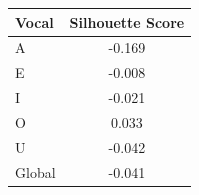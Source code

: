 \begin{tabular}{lc}
\toprule
\rowcolor{col01}
Vocal & Silhouette Score \\
\midrule
A & -0.169 \\
E & -0.008 \\
I & -0.021 \\
O & 0.033 \\
U & -0.042 \\
Global & -0.041 \\
\bottomrule
\end{tabular}
